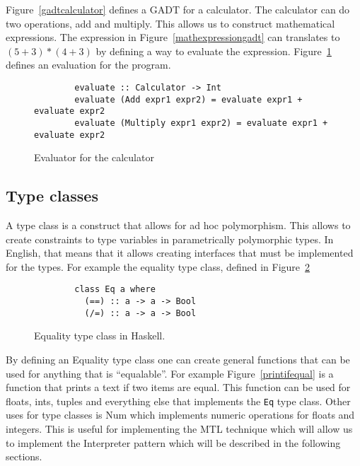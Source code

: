 Figure~\ref{gadtcalculator} defines a GADT for a calculator. The calculator can
do two operations, add and multiply. This allows us to construct mathematical
expressions. The expression in Figure~\ref{mathexpressiongadt} can translates to
$(5+3)*(4+3)$ by defining a way to evaluate the expression.
Figure~\ref{calculator} defines an evaluation for the program.

\begin{figure}[H]
    \begin{lstlisting}
        evaluate :: Calculator -> Int
        evaluate (Add expr1 expr2) = evaluate expr1 + evaluate expr2
        evaluate (Multiply expr1 expr2) = evaluate expr1 + evaluate expr2
    \end{lstlisting}
    \caption{Evaluator for the calculator}
    \label{calculator}
\end{figure}

\subsection{Type classes}\label{typeclass}

A type class is a construct that allows for ad hoc polymorphism. This allows to
create constraints to type variables in parametrically polymorphic types. In
English, that means that it allows creating interfaces that must be implemented
for the types. For example the equality type class, defined in
Figure~\ref{equalitytypeclass}

\begin{figure}[H]
    \begin{lstlisting}
        class Eq a where
          (==) :: a -> a -> Bool
          (/=) :: a -> a -> Bool
    \end{lstlisting}
    \caption{Equality type class in Haskell.}
    \label{equalitytypeclass}
\end{figure}

By defining an Equality type class one can create general functions that can be
used for anything that is ``equalable''. For example Figure~\ref{printifequal}
is a function that prints a text if two items are equal. This function can be
used for floats, ints, tuples and everything else that implements the
\texttt{Eq} type class. Other uses for type classes is Num which implements
numeric operations for floats and integers. This is useful for implementing the
MTL technique which will allow us to implement the Interpreter pattern which
will be described in the following sections.

